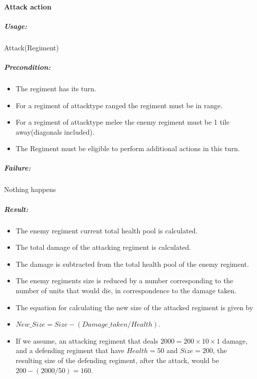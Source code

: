 		\paragraph{Attack action}
		\subparagraph{Usage:} 
		Attack(Regiment) \\
		
		\subparagraph{Precondition:} 
		\begin{itemize}\itemsep0.0001cm
		\item The regiment has its turn. \\
		\item For a regiment of attacktype ranged the regiment must be in range. \\
		\item For a regiment of attacktype melee the enemy regiment must be 1 tile away(diagonals included). \\
		\item The Regiment must be eligible to perform additional actions in this turn.\\
		\end{itemize}
		\subparagraph{Failure:} 
		Nothing happens \\
		
		\subparagraph{Result:}
		\begin{itemize} 
		\item The enemy regiment current total health pool is calculated.\\ 
		\item The total damage of the attacking regiment is calculated. \\
		\item The damage is subtracted from the total health pool of the enemy regiment.\\
		\item The enemy regiments size is reduced by a number corresponding to the number of units that would die, in correspondence to the damage taken.\\
		\item The equation for calculating the new size of the attacked regiment is given by \\
		\item $New\_Size = Size - (Damage\_taken / Health)$.
		\item If we assume, an attacking regiment that deals $2000 = 200 \times 10 \times 1$ damage, and a defending regiment that have $Health = 50$ and $Size = 200$, the resulting size of the defending regiment, after the attack, would be $200-(2000/50)=160$.
		\end{itemize}
